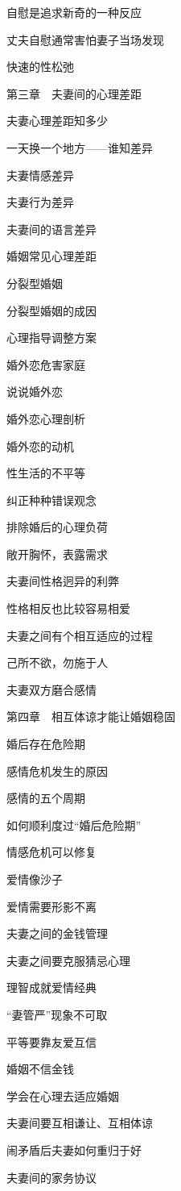 \documentclass[12pt,UTF8]{ctexbook}
\begin{document}
自慰是追求新奇的一种反应

丈夫自慰通常害怕妻子当场发现

快速的性松弛

第三章　夫妻间的心理差距

夫妻心理差距知多少

一天换一个地方——谁知差异

夫妻情感差异

夫妻行为差异

夫妻间的语言差异

婚姻常见心理差距

分裂型婚姻

分裂型婚姻的成因

心理指导调整方案

婚外恋危害家庭

说说婚外恋

婚外恋心理剖析

婚外恋的动机

性生活的不平等

纠正种种错误观念

排除婚后的心理负荷

敞开胸怀，表露需求

夫妻间性格迥异的利弊

性格相反也比较容易相爱

夫妻之间有个相互适应的过程

己所不欲，勿施于人

夫妻双方磨合感情

第四章　相互体谅才能让婚姻稳固

婚后存在危险期

感情危机发生的原因

感情的五个周期

如何顺利度过“婚后危险期”

情感危机可以修复

爱情像沙子

爱情需要形影不离

夫妻之间的金钱管理

夫妻之间要克服猜忌心理

理智成就爱情经典

“妻管严”现象不可取

平等要靠友爱互信

婚姻不信金钱

学会在心理去适应婚姻

夫妻间要互相谦让、互相体谅

闹矛盾后夫妻如何重归于好

夫妻间的家务协议
\end{document}
